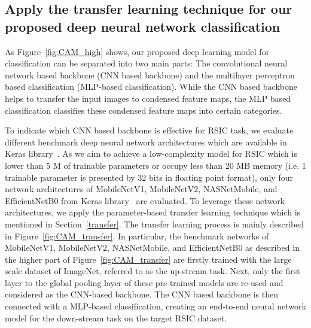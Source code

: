 \documentclass[sigconf]{acmart}
\begin{document}
\subsection{Apply the transfer learning technique for our proposed deep neural network classification}
\label{neural}

As Figure~\ref{fig:CAM_high} shows, our proposed deep learning model for classification can be separated into two main parts: The convolutional neural network based backbone (CNN based backbone) and the multilayer perceptron based classification (MLP-based classification).
While the CNN based backbone helps to transfer the input images to condensed feature maps, the MLP based classification classifies these condensed feature maps into certain categories.

To indicate which CNN based backbone is effective for RSIC task, we evaluate different benchmark deep neural network architectures which are available in Keras library~\cite{keras_app}.
As we aim to achieve a low-complexity model for RSIC which is lower than 5 M of trainable parameters or occupy less than 20 MB memory (i.e. 1 trainable parameter is presented by 32 bits in floating point format), only four network architectures of MobileNetV1, MobileNetV2, NASNetMobile, and EfficientNetB0 from Keras library~\cite{keras_app} are evaluated.
To leverage these network architectures, we apply the parameter-based transfer learning technique which is mentioned in Section~\ref{transfer}.
The transfer learning process is mainly described in Figure~\ref{fig:CAM_transfer}.
In particular, the benchmark networks of MobileNetV1, MobileNetV2, NASNetMobile, and EfficientNetB0 as described in the higher part of Figure~\ref{fig:CAM_transfer} are firstly trained with the large scale dataset of ImageNet, referred to as the up-stream task.
Next, only the first layer to the global pooling layer of these pre-trained models are re-used and considered as the CNN-based backbone.
The CNN based backbone is then connected with a MLP-based classification, creating an end-to-end neural network model for the down-stream task on the target RSIC dataset.
\end{document}
